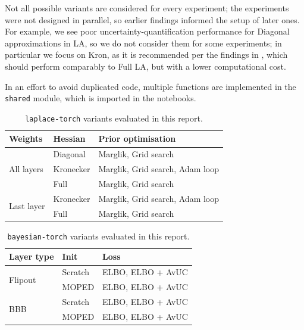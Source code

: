 \documentclass[conference]{IEEEtran}
\begin{document}
Not all possible variants are considered for every experiment; the experiments were not
designed in parallel, so earlier findings informed the setup of later ones. For example, we
see poor uncertainty-quantification performance for Diagonal approximations in LA, so we
do not consider them for some experiments; in particular we focus on Kron, as it is
recommended per the findings in \citet{daxberger2021laplace}, which should perform
comparably to Full LA, but with a lower computational cost.

In an effort to avoid duplicated code, multiple functions are implemented in the
\texttt{shared} module, which is imported in the notebooks.

\begin{table}[h]
\centering
\begin{tabular}{llp{5cm}}
\hline
\textbf{Weights} & \textbf{Hessian} & \textbf{Prior optimisation} \\
\hline
\multirow{3}{*}{All layers}  & Diagonal  & Marglik, Grid search \\
                              & Kronecker & Marglik, Grid search, Adam loop \\
                              & Full      & Marglik, Grid search \\
\hline
\multirow{2}{*}{Last layer}  & Kronecker & Marglik, Grid search, Adam loop \\
                              & Full      & Marglik, Grid search \\
\hline
\end{tabular}
\caption{\texttt{laplace-torch} variants evaluated in this report.}
\label{tab:la_variants}
\end{table}

\begin{table}[h]
\centering
\begin{tabular}{lll}
\hline
\textbf{Layer type} & \textbf{Init} & \textbf{Loss} \\
\hline
\multirow{2}{*}{Flipout} & Scratch & ELBO, ELBO + AvUC \\
                          & MOPED   & ELBO, ELBO + AvUC \\
\hline
\multirow{2}{*}{BBB}     & Scratch & ELBO, ELBO + AvUC \\
                          & MOPED   & ELBO, ELBO + AvUC \\
\hline
\end{tabular}
\caption{\texttt{bayesian-torch} variants evaluated in this report.}
\label{tab:bt_variants}
\end{table}
\end{document}
